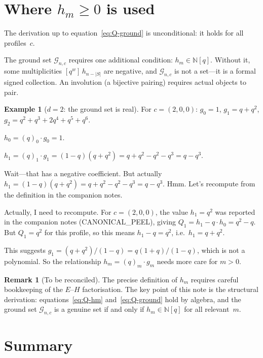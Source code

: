 \documentclass[11pt]{article}
\newcommand{\N}{\mathbb{N}}
\theoremstyle{plain}
\theoremstyle{definition}
\newtheorem{example}[theorem]{Example}
\newtheorem{remark}[theorem]{Remark}
\begin{document}
\section{Where $h_m \geq 0$ is used}

The derivation up to equation~\eqref{eq:Q-ground} is
unconditional: it holds for all profiles~$c$.

The ground set $\mathcal{G}_{n,c}$ requires one additional
condition: $h_m \in \N[q]$.  Without it, some
multiplicities $[q^w]\, h_{n-|S|}$ are negative, and
$\mathcal{G}_{n,c}$ is not a set---it is a formal signed
collection.  An involution (a bijective pairing) requires
actual objects to pair.

\begin{example}[$d = 2$: the ground set is real]
For $c = (2,0,0)$: $g_0 = 1$, $g_1 = q + q^2$,
$g_2 = q^2 + q^3 + 2q^4 + q^5 + q^6$.

$h_0 = (q)_0 \cdot g_0 = 1$.

$h_1 = (q)_1 \cdot g_1 = (1-q)(q + q^2) = q + q^2 - q^2 - q^3 = q - q^3$.

Wait---that has a negative coefficient.  But actually
$h_1 = (1-q)(q+q^2) = q + q^2 - q^2 - q^3 = q - q^3$.
Hmm.  Let's recompute from the definition in the
companion notes.
\end{example}

Actually, I need to recompute.  For $c = (2,0,0)$, the
value $h_1 = q^2$ was reported in the companion notes
(CANONICAL\_PEEL), giving $Q_1 = h_1 - q \cdot h_0 =
q^2 - q$.  But $Q_1 = q^2$ for this profile, so this
means $h_1 - q = q^2$, i.e.\ $h_1 = q + q^2$.

This suggests $g_1 = (q+q^2)/(1-q) = q(1+q)/(1-q)$,
which is not a polynomial.  So the relationship
$h_m = (q)_m \cdot g_m$ needs more care for $m > 0$.

\begin{remark}[To be reconciled]
The precise definition of $h_m$ requires careful
bookkeeping of the $E$--$H$ factorisation.  The key
point of this note is the structural derivation:
equations~\eqref{eq:Q-hm} and~\eqref{eq:Q-ground} hold
by algebra, and the ground set $\mathcal{G}_{n,c}$ is a
genuine set if and only if $h_m \in \N[q]$ for all
relevant~$m$.
\end{remark}


\section{Summary}
\end{document}
